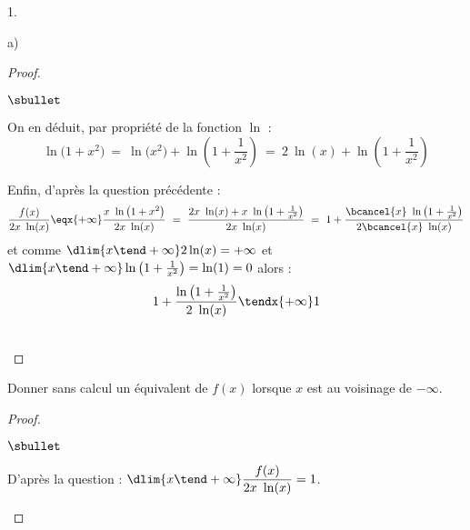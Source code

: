 \documentclass[11pt]{article}%
\begin{document}
\begin{noliste}{1.}
\begin{noliste}{a)}
\begin{proof}
\begin{noliste}{$\sbullet$}
      \item On en déduit, par propriété de la fonction $\ln$ :
        \[
        \ln\big( 1 + x^2 \big) \ = \ \ln\big (x^2 \big) + \ln \left(1
          + \dfrac{1}{x^2} \right) \ = \ 2 \ \ln(x) + \ln \left(1 +
          \dfrac{1}{x^2} \right)
        \]

      \item Enfin, d'après la question précédente :
        \[
        \dfrac{f(x)}{2x \ \ln(x)} \eqx{+\infty} \dfrac{x \ \ln\big( 1
          + x^2 \big)}{2x \ \ln(x)} \ = \ \dfrac{2x \ \ln(x) + x \ \ln
          \left(1 + \frac{1}{x^2} \right)}{2x \ \ln(x)} \ = \ 1 +
        \dfrac{\bcancel{x} \ \ln \left(1 + \frac{1}{x^2} \right)}{2
          \bcancel{x} \ \ln(x)}
        \]
        et comme $\dlim{x \tend +\infty} 2 \ln(x) = +\infty$ et
        $\dlim{x \tend + \infty} \ln \left(1 + \frac{1}{x^2} \right) =
        \ln(1) = 0$ alors :
        \[
        1 + \dfrac{\ln \left(1 + \frac{1}{x^2} \right)}{2 \ \ln(x)}
        \tendx{+\infty} 1
        \]
      \end{noliste}
      ~\\[-1.2cm]
    \end{proof}

  \item Donner sans calcul un équivalent de $f(x)$ lorsque $x$ est au
    voisinage de $-\infty$.

    \begin{proof}~%
      \begin{noliste}{$\sbullet$}
      \item D'après la question  : %
        $
        \dlim{x \tend +\infty} \dfrac{f(x)}{2x \ \ln(x)} = 1
        $.


\end{noliste}
\end{proof}
\end{noliste}
\end{noliste}
\end{document}
